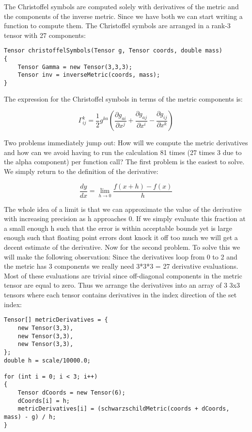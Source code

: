 \documentclass{article}
\begin{document}
The Christoffel symbols are computed solely with derivatives of the metric and the components of the inverse metric. Since we have both we can start writing a function to compute them. The Christoffel symbols are arranged in a rank-3 tensor with 27 components:

\begin{verbatim}
Tensor christoffelSymbols(Tensor g, Tensor coords, double mass)
{
    Tensor Gamma = new Tensor(3,3,3);
    Tensor inv = inverseMetric(coords, mass);
}
\end{verbatim}

The expression for the Christoffel symbols in terms of the metric components is:

\begin{equation*}
  \Gamma^k_{ij} = \frac{1}{2} g^{ka}(\frac{\partial g_{ai}}{\partial x^j} + \frac{\partial g_{aj}}{\partial x^i} - \frac{\partial g_{ij}}{\partial x^k})
\end{equation*}

Two problems immediately jump out: How will we compute the metric derivatives and how can we avoid having to run the calculation 81 times (27 times 3 due to the alpha component) per function call? The first problem is the easiest to solve. We simply return to the definition of the derivative:

\begin{equation*}
\frac{dy}{dx} = \lim_{h \to 0} \frac{f(x+h)-f(x)}{h}
\end{equation*}

The whole idea of a limit is that we can approximate the value of the derivative with increasing precision as h approaches 0. If we simply evaluate this fraction at a small enough h such that the error is within acceptable bounds yet is large enough such that floating point errors dont knock it off too much we will get a decent estimate of the derivative. Now for the second problem. To solve this we will make the following observation: Since the derivatives loop from 0 to 2 and the metric has 3 components we really need 3*3*3 = 27 derivative evaluations. Most of these evaluations are trivial since off-diagonal components in the metric tensor are equal to zero. Thus we arrange the derivatives into an array of 3 3x3 tensors where each tensor contains derivatives in the index direction of the set index:

\begin{verbatim}
Tensor[] metricDerivatives = {
    new Tensor(3,3),
    new Tensor(3,3),
    new Tensor(3,3),
};
double h = scale/10000.0;

for (int i = 0; i < 3; i++)
{
    Tensor dCoords = new Tensor(6);
    dCoords[i] = h;
    metricDerivatives[i] = (schwarzschildMetric(coords + dCoords, mass) - g) / h;
}
\end{verbatim}
\end{document}
